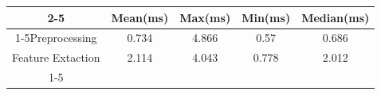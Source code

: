 \documentclass{standalone}
\begin{document}
 
 \begin{tabular}{|c |c |c |c |c |}
\cline{2-5}\cline{2-5} \multicolumn{1}{c |}{ } & Mean(ms) & Max(ms) & Min(ms) & Median(ms)\\ 
\cline{1-5}Preprocessing & 0.734 & 4.866 & 0.57 & 0.686\\ 
 \hhline{|=|=|=|=|=|}Feature Extaction & 2.114 & 4.043 & 0.778 & 2.012\\ 
 \cline{1-5}\hline \end{tabular}
 
\end{document}
